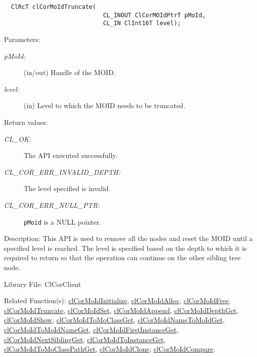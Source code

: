 \begin{flushleft}
\begin{Desc}
\footnotesize\begin{verbatim}  ClRcT clCorMoIdTruncate(
             				CL_INOUT ClCorMOIdPtrT pMoId,
             				CL_IN ClInt16T level);
\end{verbatim}
\normalsize
\end{Desc}
\begin{Desc}
\item[Parameters:]
\begin{description}
\item[{\em p\-MoId:}](in/out) Handle of the MOID. 
\item[{\em level:}](in) Level to which the MOID needs to be truncated.\end{description}
\end{Desc}
\begin{Desc}
\item[Return values:]
\begin{description}
\item[{\em CL\_\-OK:}]The API executed successfully. 
\item[{\em CL\_\-COR\_\-ERR\_\-INVALID\_\-DEPTH:}]The level specified is invalid. 
\item[{\em CL\_\-COR\_\-ERR\_\-NULL\_\-PTR:}]{\tt{pMoid}} is a NULL pointer.\end{description}
\end{Desc}
\begin{Desc}
\item[Description:]This API is used to remove all the nodes and reset the MOID until a specified level is reached. The level is specified
based on the depth to which it is required to return so that the operation can continue on the other sibling tree node.\end{Desc}
\begin{Desc}
\item[Library File:]Cl\-Cor\-Client\end{Desc}
\begin{Desc}
\item[Related Function(s):]\hyperlink{pagecor100}{cl\-Cor\-MoId\-Initialize}, \hyperlink{pagecor113}{cl\-Cor\-MoId\-Alloc}, 
\hyperlink{pagecor114}{cl\-Cor\-MoId\-Free},
\hyperlink{pagecor115}{cl\-Cor\-MoId\-Truncate}, 
\hyperlink{pagecor116}{cl\-Cor\-MoId\-Set}, 
\hyperlink{pagecor117}{cl\-Cor\-MoId\-Append}, 
\hyperlink{pagecor118}{cl\-Cor\-MoId\-Depth\-Get}, 
\hyperlink{pagecor119}{cl\-Cor\-MoId\-Show}, 
\hyperlink{pagecor120}{cl\-Cor\-MoId\-To\-Mo\-Class\-Get}, 
\hyperlink{pagecor121}{cl\-Cor\-MoId\-Name\-To\-MoId\-Get}, 
\hyperlink{pagecor122}{cl\-Cor\-MoId\-To\-MoId\-Name\-Get}, 
\hyperlink{pagecor123}{cl\-Cor\-MoId\-First\-Instance\-Get},
\hyperlink{pagecor124}{cl\-Cor\-MoId\-Next\-Sibling\-Get}, 
\hyperlink{pagecor125}{cl\-Cor\-MoId\-To\-Instance\-Get}, 
\hyperlink{pagecor126}{cl\-Cor\-MoId\-To\-Mo\-Class\-Path\-Get}, 
\hyperlink{pagecor127}{cl\-Cor\-MoId\-Clone}, 
\hyperlink{pagecor128}{cl\-Cor\-MoId\-Compare}.\end{Desc}
\newpage




\end{flushleft}
